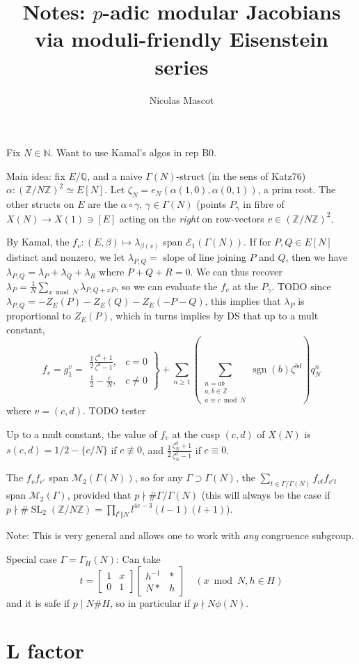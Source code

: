 \documentclass[12pt]{article}
\title{Notes: $p$-adic modular Jacobians via moduli-friendly Eisenstein series}
\author{Nicolas Mascot}
\newcommand{\N}{\mathbb{N}}
\newcommand{\Z}{\mathbb{Z}}
\newcommand{\Q}{\mathbb{Q}}
\newcommand{\M}{\mathcal{M}}
\newcommand{\E}{\mathcal{E}}
\newcommand{\SL}{\operatorname{SL}}
\newcommand{\sgn}{\operatorname{sgn}}
\newcommand{\smat}[4]{\left[ \begin{smallmatrix} #1 & #2 \\ #3 & #4 \end{smallmatrix} \right]}
\theoremstyle{definition}
\begin{document}
Fix $N \in \N$. Want to use Kamal's algos in rep B0.


Main idea: fix $E/\Q$, and a naive $\Gamma(N)$-struct (in the sens of Katz76) $\alpha: (\Z/N\Z)^2 \simeq E[N]$. Let $\zeta_N = e_N(\alpha(1,0),\alpha(0,1))$, a prim root. The other structs on $E$ are the $\alpha \circ \gamma$, $\gamma \in \Gamma(N)$ (points $P_\gamma$ in fibre of $X(N) \longrightarrow X(1) \ni [E]$ acting on the \emph{right} on row-vectors $v \in (\Z/N\Z)^2$.

By Kamal, the $f_v : (E,\beta) \mapsto \lambda_{\beta(v)}$ span $\E_1(\Gamma(N))$. If for $P,Q \in E[N]$ distinct and nonzero, we let $\lambda_{P,Q} = $ slope of line joining $P$ and $Q$, then we have $\lambda_{P,Q} = \lambda_P + \lambda_{Q} + \lambda_{R}$ where $P+Q+R=0$. We can thus recover $\lambda_P = \frac1N \sum_{x \bmod N} \lambda_{P,Q+xP}$, so we can evaluate the $f_v$ at the $P_\gamma$. TODO since $\lambda_{P,Q} = -Z_E(P)-Z_E(Q)-Z_E(-P-Q)$, this implies that $\lambda_P$ is proportional to $Z_E(P)$, which in turns implies by DS that up to a mult constant,
\[ f_v = g_1^v = \left. \begin{array}{cc} \frac12 \frac{\zeta^d+1}{\zeta^d-1}, & c =0 \\ \frac12 - \frac{c}N, & c \neq 0 \end{array} \right\} + \sum_{n \geqslant 1} \left( \sum_{\substack{n=ab \\ a,b \in \Z \\ a \equiv c \bmod N}} \sgn(b) \zeta^{bd} \right) q_N^n \]
where $v=(c,d)$. TODO tester

Up to a mult constant, the value of $f_v$ at the cusp $(c,d)$ of $X(N)$ is $s(c,d) = 1/2 - \{c/N\}$ if $c \not \equiv 0$, and $\frac12 \frac{\zeta_N^d+1}{\zeta_N^d-1}$ if $c \equiv 0$.

The $f_{v} f_{v'}$ span $\M_2(\Gamma(N))$, so for any $\Gamma \supset \Gamma(N)$, the $\sum_{t \in \Gamma / \Gamma(N)} f_{v t } f_{v' t}$ span $\M_2(\Gamma)$, provided that $p \nmid \# \Gamma/\Gamma(N)$ (this will always be the case if $p \nmid \#\SL_2(\Z/N\Z) = \prod_{l^e \Vert N} l^{4e-3} (l-1)(l+1)$).

Note: This is very general and allows one to work with \emph{any} congruence subgroup.

Special case $\Gamma = \Gamma_H(N)$: Can take
\[ t = \smat{1}{x}{0}{1} \smat{h^{-1}}{*}{N*}{h} \quad (x \bmod N, h \in H) \]
and it is safe if $p \mid N \#H$, so in particular if $p \nmid N \phi(N)$.

\section{L factor}
\end{document}
